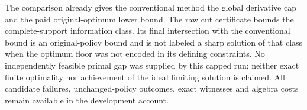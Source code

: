 The comparison already gives the conventional method the global derivative
cap and the paid original-optimum lower bound. The raw cut certificate bounds
the complete-support information class. Its final intersection with the
conventional bound is an original-policy bound and is not labeled a sharp
solution of that class when the optimum floor was not encoded in its defining
constraints. No independently feasible primal gap was supplied by this capped
run; neither exact finite optimality nor achievement of the ideal limiting solution
is claimed. All candidate failures, unchanged-policy outcomes, exact witnesses
and algebra costs remain available in the development account.
